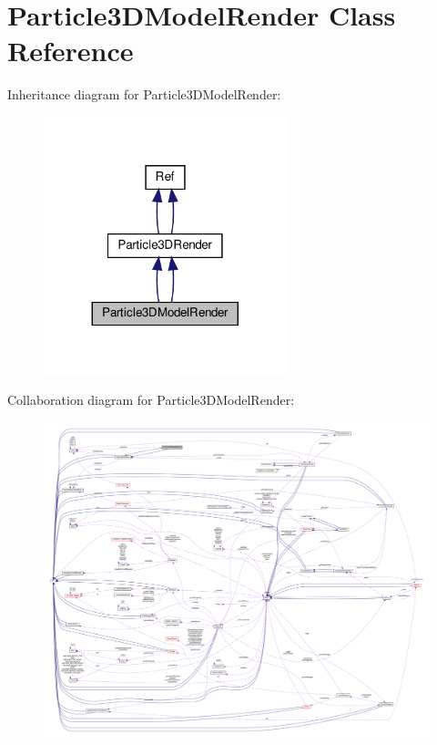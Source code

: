 \hypertarget{classParticle3DModelRender}{}\section{Particle3\+D\+Model\+Render Class Reference}
\label{classParticle3DModelRender}


Inheritance diagram for Particle3\+D\+Model\+Render\+:
\nopagebreak
\begin{figure}[H]
\begin{center}
\leavevmode
\includegraphics[width=200pt]{classParticle3DModelRender__inherit__graph}
\end{center}
\end{figure}


Collaboration diagram for Particle3\+D\+Model\+Render\+:
\nopagebreak
\begin{figure}[H]
\begin{center}
\leavevmode
\includegraphics[width=350pt]{classParticle3DModelRender__coll__graph}
\end{center}
\end{figure}
